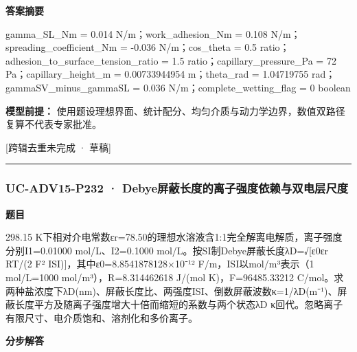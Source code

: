 \documentclass[UTF8,11pt,a4paper]{ctexart}
\begin{document}
\noindent\textbf{答案摘要}\par
gamma\_SL\_Nm = 0.014 N/m；work\_adhesion\_Nm = 0.108 N/m；spreading\_coefficient\_Nm = -0.036 N/m；cos\_theta = 0.5 ratio；adhesion\_to\_surface\_tension\_ratio = 1.5 ratio；capillary\_pressure\_Pa = 72 Pa；capillary\_height\_m = 0.00733944954 m；theta\_rad = 1.04719755 rad；gammaSV\_minus\_gammaSL = 0.036 N/m；complete\_wetting\_flag = 0 boolean\par
\noindent\textbf{模型前提：}
使用题设理想界面、统计配分、均匀介质与动力学边界，数值双路径复算不代表专家批准。\par
\noindent\textcolor{red!65!black}{[跨辑去重未完成 · 草稿]} \par
\medskip\hrule\medskip
{}
\subsubsection*{UC-ADV15-P232 · Debye屏蔽长度的离子强度依赖与双电层尺度}
\noindent\textbf{题目}\par
298.15 K下相对介电常数εr=78.50的理想水溶液含1:1完全解离电解质，离子强度分别I1=0.01000 mol/L、I2=0.1000 mol/L。按SI制Debye屏蔽长度λD=√[ε0εr RT/(2 F² ISI)]，其中ε0=8.8541878128×10⁻¹² F/m，ISI以mol/m³表示（1 mol/L=1000 mol/m³），R=8.314462618 J/(mol K)，F=96485.33212 C/mol。求两种盐浓度下λD(nm)、屏蔽长度比、两强度ISI、倒数屏蔽波数κ=1/λD(m⁻¹)、屏蔽长度平方及随离子强度增大十倍而缩短的系数与两个状态λD κ回代。忽略离子有限尺寸、电介质饱和、溶剂化和多价离子。\par
\medskip\noindent\textbf{分步解答}
\end{document}

